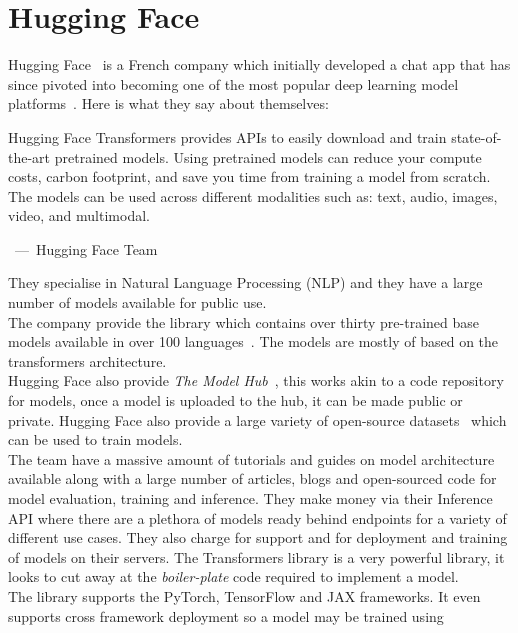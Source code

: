 \section{Hugging Face}
Hugging Face~\autocite{HuggingFaceAI} is a French company which initially developed a chat app that has since pivoted into becoming one of the most
popular deep learning model platforms~\autocite{syalHuggingFaceStep2020}. Here is what they say about themselves:
\begin{quoting}
	Hugging Face Transformers provides APIs to easily download and train state-of-the-art pretrained models. Using pretrained models can reduce your compute
	costs, carbon footprint, and save you time from training a model from scratch. The models can be used across different modalities such as:
	text, audio, images, video, and multimodal.
	\begin{flushright}
		~---~Hugging Face Team
	\end{flushright}
\end{quoting}
They specialise in Natural Language Processing (NLP) and they have a large number of models available for public use.\\
The company provide the  library which contains over thirty pre-trained base models available
in over 100 languages~\autocite{HuggingFaceTransformers}. The models are mostly of based on the transformers architecture.\\
Hugging Face also provide \emph{The Model Hub}~\autocite{ModelsHuggingFace}, this works akin to a code repository for models, once a model is uploaded to the hub, it can be
made public or private. Hugging Face also provide a large variety of open-source datasets~\autocite{HuggingFaceAIa} which can be used to train models.\\
The team have a massive amount of tutorials and guides on model architecture available along with a large number of articles, blogs and open-sourced code for
model evaluation, training and inference.
\bigbreak
They make money via their Inference API where there are a plethora of models ready behind endpoints for a variety of different use cases.
They also charge for support and for deployment and training of models on their servers.
\bigbreak
The Transformers library is a very powerful library, it looks to cut away at the \emph{boiler-plate} code required to implement a model.\\
The library supports the PyTorch, TensorFlow and JAX frameworks. It even supports cross framework deployment so a model may be trained using
